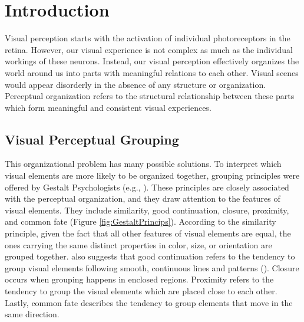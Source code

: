 \documentclass{article}
\begin{document}
\clearpage

\tableofcontents

\clearpage

\section{Introduction}
Visual perception starts with the activation of individual photoreceptors in the retina. However, our visual experience is not complex as much as the individual workings of these neurons. Instead, our visual perception effectively organizes the world around us into parts with meaningful relations to each other. Visual scenes would appear disorderly in the absence of any structure or organization. Perceptual organization refers to the structural relationship between these parts which form meaningful and consistent visual experiences.

\subsection{Visual Perceptual Grouping}
This organizational problem has many possible solutions. To interpret which visual elements are more likely to be organized together, grouping principles were offered by Gestalt Psychologists (e.g., \cite{wertheimer1923brief}). These principles are closely associated with the perceptual organization, and they draw attention to the features of visual elements. They include similarity, good continuation, closure, proximity, and common fate (Figure \ref{fig:GestaltPrincips}). According to the similarity principle, given the fact that all other features of visual elements are equal, the ones carrying the same distinct properties in color, size, or orientation are grouped together. \citeauthor{wertheimer1923brief} also suggests that good continuation refers to the tendency to group visual elements following smooth, continuous lines and patterns (\citeyear{wertheimer1923brief}). Closure occurs when grouping happens in enclosed regions. Proximity refers to the tendency to group the visual elements which are placed close to each other. Lastly, common fate describes the tendency to group elements that move in the same direction.
\end{document}
